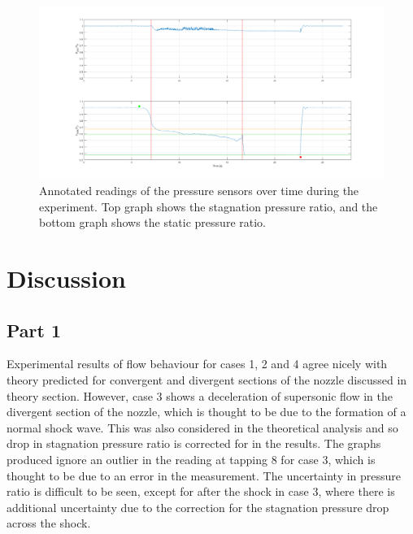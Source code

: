\documentclass{article}
\begin{document}
\begin{figure}[H]
    \centering
    \includegraphics[width=1\textwidth]{../Supersonic_Nozzle/tunnel_pressures_annotated.png}
    \caption{Annotated readings of the pressure sensors over time during the experiment. Top graph shows the stagnation pressure ratio, and the bottom graph shows the static pressure ratio.}
    \label{fig:figure8}
\end{figure}

\newpage

\section{Discussion}

\subsection{Part 1}

Experimental results of flow behaviour for cases 1, 2 and 4 agree nicely with theory predicted for convergent and divergent sections of the nozzle discussed in theory section.
However, case 3 shows a deceleration of supersonic flow in the divergent section of the nozzle, which is thought to be due to the formation of a normal shock wave.
This was also considered in the theoretical analysis and so drop in stagnation pressure ratio is corrected for in the results.
The graphs produced ignore an outlier in the reading at tapping 8 for case 3, which is thought to be due to an error in the measurement.
The uncertainty in pressure ratio is difficult to be seen, except for after the shock in case 3, where there is additional uncertainty due to the correction for the stagnation pressure drop across the shock.
\end{document}
